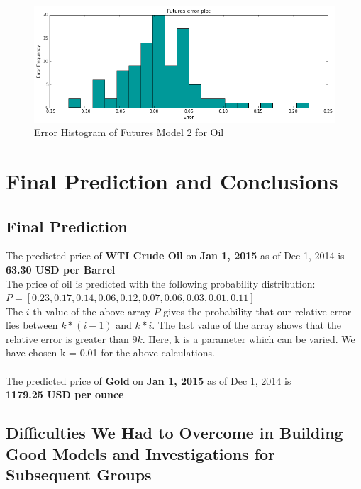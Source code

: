 \documentclass[runningheads]{llncs}
\begin{document}
\begin{figure}
\centering
\includegraphics[width=\textwidth]{futures_oil2.png}
\caption{Error Histogram of Futures Model 2 for Oil}
\label{fig:futures_oil2.png}
\end{figure}


\newpage
\section{Final Prediction and Conclusions}
\subsection {Final Prediction}
\noindent The predicted price of \textbf{WTI Crude Oil} on \textbf{Jan 1, 2015} as of Dec 1, 2014 is \\
\textbf{63.30 USD per Barrel} \\

\noindent The price of oil is predicted with the following probability distribution: \\
$P = [0.23, 0.17, 0.14, 0.06, 0.12, 0.07, 0.06, 0.03, 0.01, 0.11]$\\

The $i$-th value of the above array $P$ gives the probability that our relative error lies between $k*(i-1)$ and $k*i$. The last value of the array shows that the relative error is greater than $9k$.
Here, k is a parameter which can be varied. We have chosen k = 0.01 for the above calculations.\\\\

\noindent The predicted price of \textbf{Gold} on \textbf{Jan 1, 2015} as of Dec 1, 2014 is \\
\textbf{1179.25 USD per ounce} \\

\subsection {Difficulties We Had to Overcome in Building Good Models and Investigations for Subsequent Groups}
\end{document}

